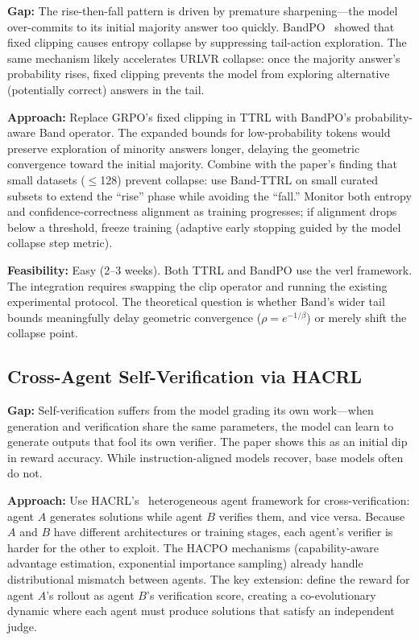 \documentclass[11pt]{article}
\begin{document}
\textbf{Gap:} The rise-then-fall pattern is driven by premature sharpening---the model over-commits to its initial majority answer too quickly. BandPO~\citep{li2026bandpo} showed that fixed clipping causes entropy collapse by suppressing tail-action exploration. The same mechanism likely accelerates URLVR collapse: once the majority answer's probability rises, fixed clipping prevents the model from exploring alternative (potentially correct) answers in the tail.

\textbf{Approach:} Replace GRPO's fixed clipping in TTRL with BandPO's probability-aware Band operator. The expanded bounds for low-probability tokens would preserve exploration of minority answers longer, delaying the geometric convergence toward the initial majority. Combine with the paper's finding that small datasets ($\leq$128) prevent collapse: use Band-TTRL on small curated subsets to extend the ``rise'' phase while avoiding the ``fall.'' Monitor both entropy and confidence-correctness alignment as training progresses; if alignment drops below a threshold, freeze training (adaptive early stopping guided by the model collapse step metric).

\textbf{Feasibility:} Easy (2--3 weeks). Both TTRL and BandPO use the verl framework. The integration requires swapping the clip operator and running the existing experimental protocol. The theoretical question is whether Band's wider tail bounds meaningfully delay geometric convergence ($\rho = e^{-1/\beta}$) or merely shift the collapse point.

\subsection{Cross-Agent Self-Verification via HACRL}

\textbf{Gap:} Self-verification suffers from the model grading its own work---when generation and verification share the same parameters, the model can learn to generate outputs that fool its own verifier. The paper shows this as an initial dip in reward accuracy. While instruction-aligned models recover, base models often do not.

\textbf{Approach:} Use HACRL's~\citep{zhang2026hacrl} heterogeneous agent framework for cross-verification: agent $A$ generates solutions while agent $B$ verifies them, and vice versa. Because $A$ and $B$ have different architectures or training stages, each agent's verifier is harder for the other to exploit. The HACPO mechanisms (capability-aware advantage estimation, exponential importance sampling) already handle distributional mismatch between agents. The key extension: define the reward for agent $A$'s rollout as agent $B$'s verification score, creating a co-evolutionary dynamic where each agent must produce solutions that satisfy an independent judge.
\end{document}
